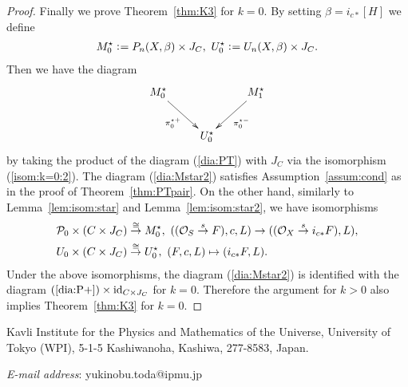 \documentclass[11pt]{amsart}
\theoremstyle{plain}
\newcommand{\oO}{\mathcal{O}}
\newcommand{\pP}{\mathcal{P}}
\begin{document}
\begin{proof}
Finally we prove Theorem~\ref{thm:K3}
for $k=0$. 
By setting 
$\beta=i_{c\ast}[H]$ we define
\begin{align*}
M_0^{\star} \cneq 
P_n(X, \beta)\times J_C, \ 
U_0^{\star} \cneq U_n(X, \beta) \times J_C.
\end{align*}
Then we have the diagram 
\begin{align}\label{dia:Mstar2}
\xymatrix{
M_0^{\star} \ar[rd] _-{\pi_0^{\star+}}& & M_{1}^{\star} \ar[ld]^-{\pi_0^{\star-}} \\
& U_0^{\star} &
}
\end{align}
by taking the product of the diagram (\ref{dia:PT})
with $J_C$ via the isomorphism (\ref{isom:k=0:2}). 
The diagram (\ref{dia:Mstar2}) satisfies 
Assumption~\ref{assum:cond}
as in the proof of Theorem~\ref{thm:PTpair}.
On the other hand,  
similarly to Lemma~\ref{lem:isom:star} and Lemma~\ref{lem:isom:star2}, 
we have 
isomorphisms
\begin{align}\notag
&\pP_0 \times (C \times J_C) \stackrel{\cong}{\to}
M_0^{\star}, \ 
((\oO_S \stackrel{s}{\to} F), c, L)
\to ((\oO_X \stackrel{s}{\to}i_{c\ast}F), L), \\
\notag
&U_0 \times (C \times J_C) \stackrel{\cong}{\to}
U_0^{\star}, \ (F, c, L) \mapsto (i_{c\ast}F, L). 
\end{align}
Under the above isomorphisms, 
the diagram (\ref{dia:Mstar2}) is identified
with the diagram $(\ref{dia:P+}) \times \mathrm{id}_{C \times J_C}$
for $k=0$.  
Therefore the argument for $k>0$ also implies
Theorem~\ref{thm:K3} for $k=0$. 
\end{proof}






Kavli Institute for the Physics and 
Mathematics of the Universe, University of Tokyo (WPI),
5-1-5 Kashiwanoha, Kashiwa, 277-8583, Japan.


\textit{E-mail address}: yukinobu.toda@ipmu.jp
\end{document}
